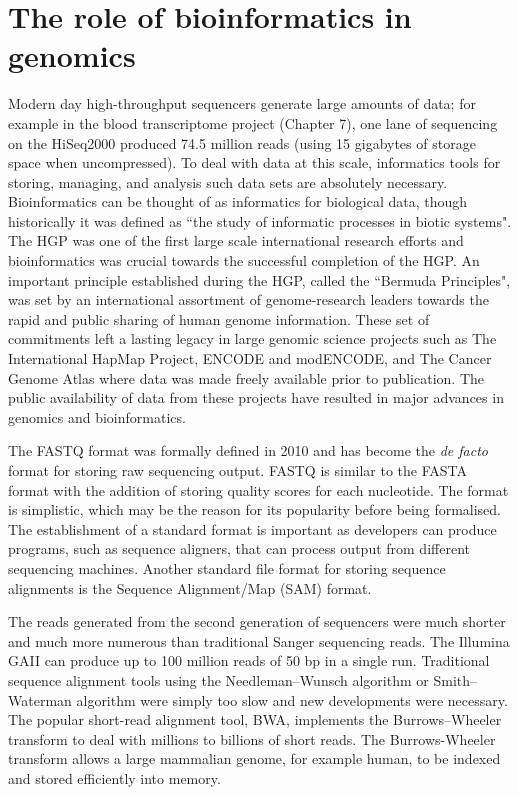 \section{The role of bioinformatics in genomics}

Modern day high-throughput sequencers generate large amounts of data; for example in the blood transcriptome project (Chapter 7), one lane of sequencing on the HiSeq2000 produced 74.5 million reads (using 15 gigabytes of storage space when uncompressed). To deal with data at this scale, informatics tools for storing, managing, and analysis such data sets are absolutely necessary. Bioinformatics can be thought of as informatics for biological data, though historically it was defined as ``the study of informatic processes in biotic systems"\cite{pmid21483479}. The HGP was one of the first large scale international research efforts and bioinformatics was crucial towards the successful completion of the HGP\cite{stein1996perl}. An important principle established during the HGP, called the ``Bermuda Principles", was set by an international assortment of genome-research leaders towards the rapid and public sharing of human genome information. These set of commitments left a lasting legacy in large genomic science projects such as The International HapMap Project, ENCODE and modENCODE, and The Cancer Genome Atlas where data was made freely available prior to publication\cite{contreras2011bermuda}. The public availability of data from these projects have resulted in major advances in genomics and bioinformatics.

The FASTQ format was formally defined in 2010\cite{pmid20015970} and has become the \textit{de facto} format for storing raw sequencing output. FASTQ is similar to the FASTA format with the addition of storing quality scores for each nucleotide. The format is simplistic, which may be the reason for its popularity before being formalised. The establishment of a standard format is important as developers can produce programs, such as sequence aligners, that can process output from different sequencing machines. Another standard file format for storing sequence alignments is the Sequence Alignment/Map (SAM) format\cite{pmid19505943}.

The reads generated from the second generation of sequencers were much shorter and much more numerous than traditional Sanger sequencing reads. The Illumina GAII can produce up to 100 million reads of 50 bp in a single run. Traditional sequence alignment tools using the Needleman–Wunsch algorithm or Smith–Waterman algorithm were simply too slow and new developments were necessary. The popular short-read alignment tool, BWA\cite{pmid19451168}, implements the Burrows–Wheeler transform to deal with millions to billions of short reads. The Burrows-Wheeler transform allows a large mammalian genome, for example human, to be indexed and stored efficiently into memory\cite{pmid19430453}.


